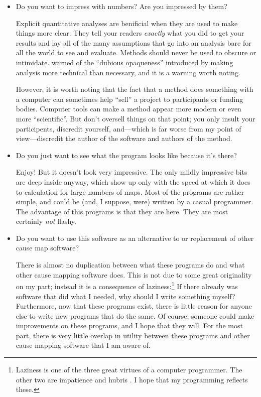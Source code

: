 \documentclass[%
	11pt,
        a4paper,
        twoside]{workrep}
\newcommand*{\scare}[1]{{``}#1\/{''}}		%
\newcommand{\dash}{---}
\begin{document}
\begin{itemize}
\item
  Do you want to impress with numbers?  Are you impressed by them?

  Explicit quantitative analyses are benificial when
  they are used to make things more clear.  They tell your
  readers \emph{exactly} what you did to get your results and
  lay all of the many assumptions that go into an analysis
  bare for all the world to see and evaluate.  Methods
  should never be used to obscure or intimidate.
   warned of the ``dubious opaqueness''
  introduced by making analysis more technical than necessary,
  and it is a warning worth noting.

  However,
  it is worth noting that the fact that a method does something
  with a computer can sometimes help \scare{sell} a project to
  participants or funding bodies.  Computer tools can make a method
  appear more modern or even more \scare{scientific}.  But
  don't oversell things on that point; you only insult your
  participents, discredit yourself, and\dash which is far worse
  from my point of view\dash discredit the author of the software
  and authors of the method.

\item
  Do you just want to see what the program looks like because it's there?

  Enjoy!  But it doesn't look very impressive.  The only mildly
  impressive bits are deep inside anyway, which show up only with the
  speed at which it does to calculation for large numbers of maps.
  Most of the programs are rather simple, and could be (and, I suppose,
  were) written by a casual programmer.  The advantage of this programs
  is that they are here.  They are most certainly \emph{not} flashy.

\item
  Do you want to use this software as an alternative to or
  replacement of other cause map software?

  There is almost no duplication between what these programs
  do and what other cause mapping software does.  This is
  not due to some great originality on my part; instead it is
  a consequence of laziness:\footnote{Laziness is one
  of the three great virtues of a computer programmer.  The other
  two are impatience and hubris \cite[p.~426]{WallSchwartz91:Camel}.
  I hope that my programming reflects these.}
  If there already was software that did what I needed, why
  should I write something myself?  Furthermore, now that these
  programs exist, there is little reason for anyone else to
  write new programs that do the same.  Of course, someone
  could make improvements on these programs, and I hope
  that they will.  For the most part, there is very little
  overlap in utility between these programs and other
  cause mapping software that I am aware of.


\end{itemize}
\end{document}
